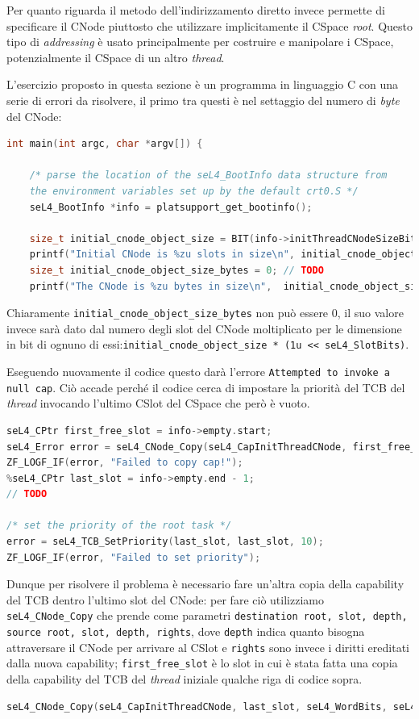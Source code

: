 Per quanto riguarda il metodo dell'indirizzamento diretto invece permette di specificare il CNode piuttosto che utilizzare implicitamente il CSpace \textit{root}. Questo tipo di \textit{addressing}  è usato principalmente per costruire e manipolare i CSpace, potenzialmente il CSpace di un altro \textit{thread}.

L'esercizio proposto in questa sezione è un programma in linguaggio C con una serie di errori da risolvere, il primo tra questi è nel settaggio del numero di \textit{byte} del CNode:
\begin{lstlisting}[language=C++]
int main(int argc, char *argv[]) {

    /* parse the location of the seL4_BootInfo data structure from
    the environment variables set up by the default crt0.S */
    seL4_BootInfo *info = platsupport_get_bootinfo();

    size_t initial_cnode_object_size = BIT(info->initThreadCNodeSizeBits);
    printf("Initial CNode is %zu slots in size\n", initial_cnode_object_size);
    size_t initial_cnode_object_size_bytes = 0; // TODO
    printf("The CNode is %zu bytes in size\n", 	initial_cnode_object_size_bytes);
\end{lstlisting}

Chiaramente \texttt{initial\_cnode\_object\_size\_bytes} non può essere 0, il suo valore invece sarà dato dal numero degli slot del CNode moltiplicato per le dimensione in bit di ognuno di essi:\texttt{initial\_cnode\_object\_size * (1u << seL4\_SlotBits)}.

Eseguendo nuovamente il codice questo darà l'errore \texttt{Attempted to invoke a null cap}. Ciò accade perché il codice cerca di impostare la priorità del TCB del \textit{thread} invocando l'ultimo CSlot del CSpace che però è vuoto.
\begin{lstlisting}[language=C++]
seL4_CPtr first_free_slot = info->empty.start;
seL4_Error error = seL4_CNode_Copy(seL4_CapInitThreadCNode, first_free_slot, seL4_WordBits, seL4_CapInitThreadCNode, seL4_CapInitThreadTCB, seL4_WordBits, seL4_AllRights);
ZF_LOGF_IF(error, "Failed to copy cap!");
%seL4_CPtr last_slot = info->empty.end - 1;
// TODO

/* set the priority of the root task */
error = seL4_TCB_SetPriority(last_slot, last_slot, 10);
ZF_LOGF_IF(error, "Failed to set priority");
\end{lstlisting}

Dunque per risolvere il problema è necessario fare un'altra copia della capability del TCB dentro l'ultimo slot del CNode: per fare ciò utilizziamo \texttt{seL4\_CNode\_Copy} che prende come parametri \texttt{destination root, slot, depth, source root, slot, depth, rights}, dove \texttt{depth} indica quanto bisogna attraversare il CNode per arrivare al CSlot e \texttt{rights} sono invece i diritti ereditati dalla nuova capability; \texttt{first\_free\_slot} è lo slot in cui è stata fatta una copia della capability del TCB del \textit{thread} iniziale qualche riga di codice sopra.
\begin{lstlisting}[language=C++]
seL4_CNode_Copy(seL4_CapInitThreadCNode, last_slot, seL4_WordBits, seL4_CapInitThreadCNode, first_free_slot, seL4_WordBits, seL4_AllRights);
\end{lstlisting}

